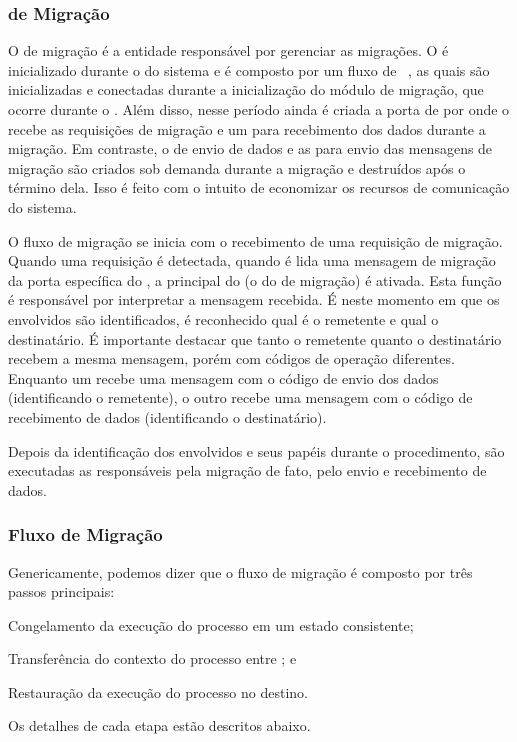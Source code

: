 \subsubsection{\Daemon de Migração}

O \daemon de migração é a entidade responsável por gerenciar as migrações. O \daemon é inicializado durante o \boot do sistema e é composto por um fluxo de \tasks~\cite{souto:thesis}, as quais são inicializadas e conectadas durante a inicialização do módulo de migração, que ocorre durante o \boot. Além disso, nesse período ainda é criada a porta de \mailbox por onde o \daemon recebe as requisições de migração e um \portal {} para recebimento dos dados durante a migração. Em contraste, o \portal de envio de dados e as \mailboxes para envio das mensagens de migração são criados sob demanda durante a migração e destruídos após o término dela. Isso é feito com o intuito de economizar os recursos de comunicação do sistema.
    
O fluxo de migração se inicia com o recebimento de uma requisição de migração. Quando uma requisição é detectada, \ie quando é lida uma mensagem de migração da porta específica do \daemon, a \task principal do \daemon (o \handler do \daemon de migração) é ativada. Esta função é responsável por interpretar a mensagem recebida. É neste momento em que os \clusters envolvidos são identificados, \ie é reconhecido qual é o \cluster remetente e qual o \cluster destinatário. É importante destacar que tanto o \cluster remetente quanto o destinatário recebem a mesma mensagem, porém com códigos de operação diferentes. Enquanto um recebe uma mensagem com o código de envio dos dados (identificando o remetente), o outro recebe uma mensagem com o código de recebimento de dados (identificando o destinatário).

Depois da identificação dos \clusters envolvidos e seus papéis durante o procedimento, são executadas as \tasks responsáveis pela migração de fato, \ie pelo envio e recebimento de dados.


\subsubsection{Fluxo de Migração}\label{sec.fluxo-migracao}

Genericamente, podemos dizer que o fluxo de migração é composto por três passos principais: 
\begin{inlinelist}
    \item Congelamento da execução do processo em um estado consistente;
    \item Transferência do contexto do processo entre \clusters; e
    \item Restauração da execução do processo no \cluster destino.
\end{inlinelist}
Os detalhes de cada etapa estão descritos abaixo.

